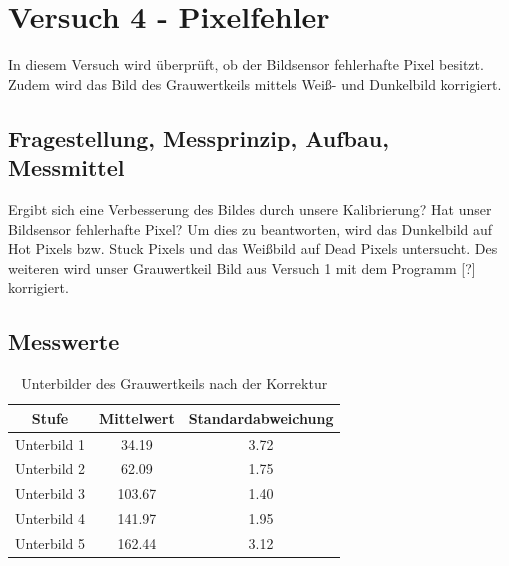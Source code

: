 \documentclass[12pt,oneside,a4paper]{report}
\begin{document}
\chapter{Versuch 4 - Pixelfehler}
\label{chap:VERSUCH_4}

In diesem Versuch wird überprüft, ob der Bildsensor fehlerhafte Pixel besitzt.
Zudem wird das Bild des Grauwertkeils mittels Weiß- und Dunkelbild korrigiert.

\section{Fragestellung, Messprinzip, Aufbau, Messmittel}
\label{chap:VERSUCH_4_FRAGESTELLUNG}

Ergibt sich eine Verbesserung des Bildes durch unsere Kalibrierung? Hat unser Bildsensor fehlerhafte Pixel? Um dies zu beantworten, wird das Dunkelbild auf Hot Pixels bzw. Stuck Pixels und das Weißbild auf Dead Pixels untersucht.
Des weiteren wird unser Grauwertkeil Bild aus Versuch 1 mit dem Programm [?] korrigiert.

\section{Messwerte}
\label{chap:VERSUCH_4_MESSWERTE}

\begin{table}[H]
\centering 
\begin{tabular}{ccc}
\hline
\textbf{Stufe} &\textbf{ Mittelwert} & \textbf{Standardabweichung} \\
\hline
Unterbild 1 & 34.19 & 3.72 \\
\hline
Unterbild 2 & 62.09 & 1.75 \\
\hline
Unterbild 3 & 103.67 & 1.40 \\
\hline
Unterbild 4 & 141.97 & 1.95 \\
\hline
Unterbild 5 & 162.44 & 3.12 \\
\hline
\end{tabular} 
\caption{Unterbilder des Grauwertkeils nach der Korrektur}
\label{tab:UNTERBILDER_KOR}
\end{table}
\end{document}
